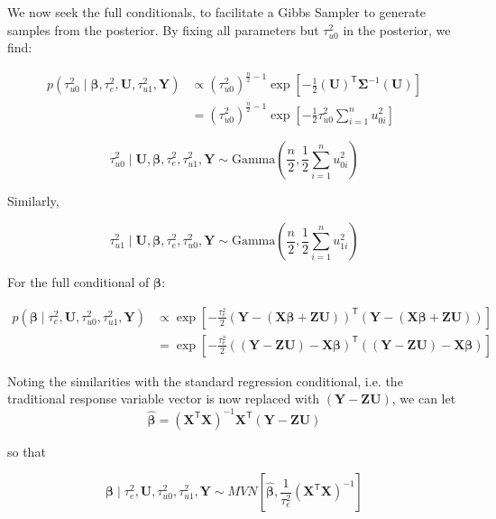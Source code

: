 \documentclass{article}
\begin{document}
We now seek the full conditionals, to facilitate a Gibbs Sampler to generate samples from the posterior. By fixing all parameters but $\tau_{u0}^2$ in the posterior, we find:

\begin{align*}
	p \left( \tau_{u0}^2 \mid \boldsymbol{\beta}, \tau_e^2, \mathbf{U}, \tau_{u1}^2, \mathbf{Y} \right) &\propto \left( \tau_{u0}^2 \right)^{\frac{n}{2}-1}  \exp \left[-\frac{1}{2} \left( \mathbf{U} \right)^{ \mathsf{T}}\boldsymbol{\Sigma}^{-1} \left( \mathbf{U} \right) \right] \\
    &= \left( \tau_{u0}^2 \right)^{\frac{n}{2}-1}  \exp \left[-\frac{1}{2}  \tau_{u0}^2 \sum_{i=1}^{n} u_{0i}^2 \right]
\end{align*}

$$\tau_{u0}^2 \mid \mathbf{U}, \boldsymbol{\beta}, \tau_e^2, \tau_{u1}^2, \mathbf{Y} \sim \mathrm{Gamma} \left( \frac{n}{2}, \frac{1}{2} \sum_{i=1}^{n} u_{0i}^2 \right)$$

Similarly,

$$\tau_{u1}^2 \mid \mathbf{U}, \boldsymbol{\beta}, \tau_e^2, \tau_{u0}^2, \mathbf{Y} \sim \mathrm{Gamma} \left( \frac{n}{2}, \frac{1}{2} \sum_{i=1}^{n} u_{1i}^2 \right)$$

For the full conditional of $\boldsymbol{\beta}$:

\begin{align*}
p \left( \boldsymbol{\beta} \mid \tau_e^2, \mathbf{U}, \tau_{u0}^2, \tau_{u1}^2, \mathbf{Y} \right) &\propto \exp \left[ -\frac{\tau_e^2}{2} \left( \mathbf{Y} - \left( \mathbf{X}\boldsymbol{\beta}+\mathbf{ZU} \right) \right)^{\mathsf{T}} \left( \mathbf{Y}- \left( \mathbf{X}\boldsymbol{\beta}+\mathbf{ZU} \right) \right) \right] \\
&= \exp \left[ -\frac{\tau_e^2}{2} \left( \left( \mathbf{Y} - \mathbf{ZU} \right) - \mathbf{X}\boldsymbol{\beta} \right)^{\mathsf{T}} \left( \left( \mathbf{Y} - \mathbf{ZU} \right) - \mathbf{X}\boldsymbol{\beta} \right) \right]
\end{align*}

Noting the similarities with the standard regression conditional, i.e. the traditional response variable vector is now replaced with $\left( \mathbf{Y} - \mathbf{ZU} \right)$, we can let
$$\hat{\boldsymbol{\beta}} = \left(\mathbf{X}^{\mathsf{T}}\mathbf{X}\right)^{-1}\mathbf{X}^{\mathsf{T}}\left( \mathbf{Y} - \mathbf{ZU} \right)$$

so that

$$\boldsymbol{\beta} \mid \tau_e^2, \mathbf{U}, \tau_{u0}^2, \tau_{u1}^2, \mathbf{Y} \sim MVN \left[ \hat{\boldsymbol{\beta}}, \frac{1}{\tau_e^2} \left( \mathbf{X}^\mathsf{T} \mathbf{X} \right)^{-1} \right]$$
\end{document}

